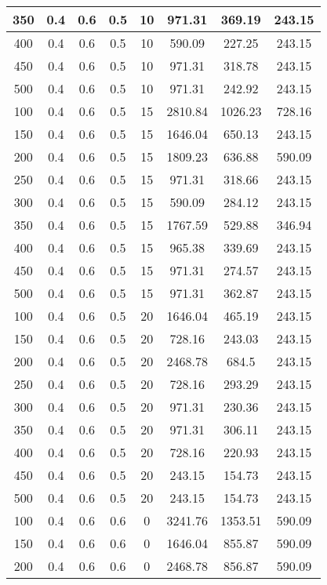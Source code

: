 \documentclass[a4paper, 12pt]{extreport}
\begin{document}
\begin{itemize}
\begin{longtable}{|c|c|c|c|c|c|c|c|}
			350 & 0.4 & 0.6 & 0.5 & 10 & 971.31 & 369.19 & 243.15 \\\hline
			400 & 0.4 & 0.6 & 0.5 & 10 & 590.09 & 227.25 & 243.15 \\\hline
			450 & 0.4 & 0.6 & 0.5 & 10 & 971.31 & 318.78 & 243.15 \\\hline
			500 & 0.4 & 0.6 & 0.5 & 10 & 971.31 & 242.92 & 243.15 \\\hline
			100 & 0.4 & 0.6 & 0.5 & 15 & 2810.84 & 1026.23 & 728.16 \\\hline
			150 & 0.4 & 0.6 & 0.5 & 15 & 1646.04 & 650.13 & 243.15 \\\hline
			200 & 0.4 & 0.6 & 0.5 & 15 & 1809.23 & 636.88 & 590.09 \\\hline
			250 & 0.4 & 0.6 & 0.5 & 15 & 971.31 & 318.66 & 243.15 \\\hline
			300 & 0.4 & 0.6 & 0.5 & 15 & 590.09 & 284.12 & 243.15 \\\hline
			350 & 0.4 & 0.6 & 0.5 & 15 & 1767.59 & 529.88 & 346.94 \\\hline
			400 & 0.4 & 0.6 & 0.5 & 15 & 965.38 & 339.69 & 243.15 \\\hline
			450 & 0.4 & 0.6 & 0.5 & 15 & 971.31 & 274.57 & 243.15 \\\hline
			500 & 0.4 & 0.6 & 0.5 & 15 & 971.31 & 362.87 & 243.15 \\\hline
			100 & 0.4 & 0.6 & 0.5 & 20 & 1646.04 & 465.19 & 243.15 \\\hline
			150 & 0.4 & 0.6 & 0.5 & 20 & 728.16 & 243.03 & 243.15 \\\hline
			200 & 0.4 & 0.6 & 0.5 & 20 & 2468.78 & 684.5 & 243.15 \\\hline
			250 & 0.4 & 0.6 & 0.5 & 20 & 728.16 & 293.29 & 243.15 \\\hline
			300 & 0.4 & 0.6 & 0.5 & 20 & 971.31 & 230.36 & 243.15 \\\hline
			350 & 0.4 & 0.6 & 0.5 & 20 & 971.31 & 306.11 & 243.15 \\\hline
			400 & 0.4 & 0.6 & 0.5 & 20 & 728.16 & 220.93 & 243.15 \\\hline
			450 & 0.4 & 0.6 & 0.5 & 20 & 243.15 & 154.73 & 243.15 \\\hline
			500 & 0.4 & 0.6 & 0.5 & 20 & 243.15 & 154.73 & 243.15 \\\hline
			100 & 0.4 & 0.6 & 0.6 & 0 & 3241.76 & 1353.51 & 590.09 \\\hline
			150 & 0.4 & 0.6 & 0.6 & 0 & 1646.04 & 855.87 & 590.09 \\\hline
			200 & 0.4 & 0.6 & 0.6 & 0 & 2468.78 & 856.87 & 590.09 \\\hline

\end{longtable}
\end{itemize}
\end{document}
